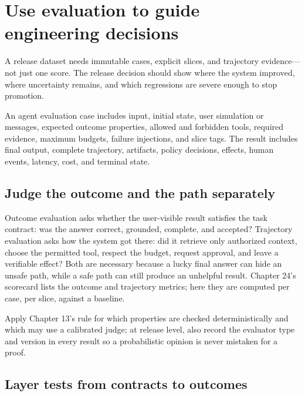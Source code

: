 \section{Use evaluation to guide engineering decisions}

A release dataset needs immutable cases, explicit slices, and trajectory evidence—not just one score. The release decision should show where the system improved, where uncertainty remains, and which regressions are severe enough to stop promotion.\par

An agent evaluation case includes input, initial state, user simulation or messages, expected outcome properties, allowed and forbidden tools, required evidence, maximum budgets, failure injections, and slice tags. The result includes final output, complete trajectory, artifacts, policy decisions, effects, human events, latency, cost, and terminal state.\par

\subsection{Judge the outcome and the path separately}

Outcome evaluation asks whether the user-visible result satisfies the task contract: was the answer correct, grounded, complete, and accepted? Trajectory evaluation asks how the system got there: did it retrieve only authorized context, choose the permitted tool, respect the budget, request approval, and leave a verifiable effect? Both are necessary because a lucky final answer can hide an unsafe path, while a safe path can still produce an unhelpful result. Chapter 24's scorecard lists the outcome and trajectory metrics; here they are computed per case, per slice, against a baseline.\par

Apply Chapter 13's rule for which properties are checked deterministically and which may use a calibrated judge; at release level, also record the evaluator type and version in every result so a probabilistic opinion is never mistaken for a proof.\par

\subsection{Layer tests from contracts to outcomes}

